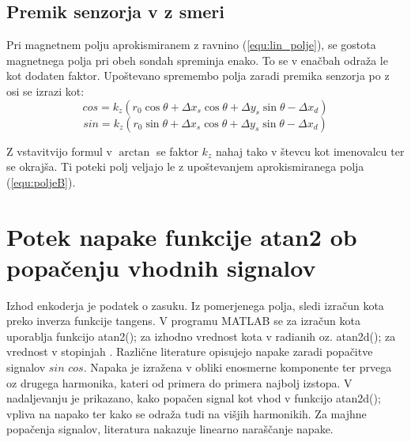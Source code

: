 \section{Premik senzorja v z smeri}

Pri magnetnem polju aprokismiranem z ravnino (\ref{equ:lin_polje}), se gostota magnetnega polja pri obeh sondah spreminja enako. To se v enačbah odraža le kot dodaten faktor. Upoštevano spremembo polja zaradi premika senzorja po z osi se izrazi kot:
\begin{equation}\label{equ:Bx_z}
cos=k_z( r_0 \cos\theta +\Delta x_s \cos\theta +\Delta y_s \sin\theta -\Delta x_d)
\end{equation}
\begin{equation}\label{equ:By_z}
sin=k_z( r_0 \sin\theta +\Delta x_s \cos\theta +\Delta y_s \sin\theta-\Delta x_d)
\end{equation}

Z vstavitvijo formul v $\arctan$ se faktor $k_z$ nahaj tako v števcu kot imenovalcu ter se okrajša. Ti poteki polj veljajo le z upoštevanjem aprokismiranega polja (\ref{equ:poljeB}).



\chapter{Potek napake funkcije atan2 ob popačenju vhodnih signalov}
Izhod enkoderja je podatek o zasuku. Iz pomerjenega polja, sledi izračun kota preko inverza funkcije tangens.
V programu MATLAB se za izračun kota uporablja funkcijo atan2(); za izhodno vrednost kota v radianih oz. atan2d(); za vrednost v stopinjah \cite{atan2Matlab}\cite{atan2dMatlab}. Različne literature \cite{Napaka_osnova} opisujejo napake zaradi popačitve signalov $sin$ $cos$. Napaka je izražena v obliki enosmerne komponente ter prvega oz drugega harmonika, kateri od primera do primera najbolj izstopa. V nadaljevanju je prikazano, kako popačen signal kot vhod v funkcijo atan2d(); vpliva na napako ter kako se odraža tudi na višjih harmonikih. Za majhne popačenja signalov, literatura nakazuje linearno naraščanje napake.

